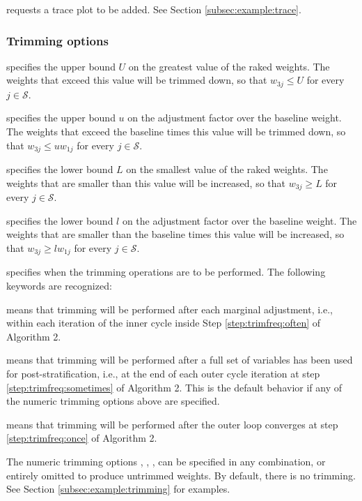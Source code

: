 \hangpara
{} requests a trace plot to be added. See
Section \ref{subsec:example:trace}.

\subsubsection{Trimming options}
\label{subsubsec:trimming}

\hangpara
{} specifies the upper bound $U$ on the greatest
    value of the raked weights.  The weights that
    exceed this value will be trimmed down, so that
    $w_{3j} \le U$ for every $j\in\mathcal{S}$.

\hangpara
{} specifies the upper bound $u$ on the adjustment
    factor over the baseline weight. The weights
    that exceed the baseline times this value will be trimmed down,
    so that $w_{3j} \le u w_{1j}$ for every $j\in\mathcal{S}$.

\hangpara
{} specifies the lower bound $L$ on the smallest value
    of the raked weights.  The weights that are smaller than this value will
    be increased, so that $w_{3j} \ge L$ for every $j\in\mathcal{S}$.

\hangpara
{} specifies the lower bound $l$ on the adjustment factor
    over the baseline weight.  The weights that are smaller than the baseline
    times this value will be increased, so that
    $w_{3j} \ge l w_{1j}$ for every $j\in\mathcal{S}$.

\hangpara
{} specifies when the trimming operations
    are to be performed. The following keywords are recognized:

\morehang {} means that trimming will be performed
    after each marginal adjustment, i.e., within each iteration of the inner
    cycle inside Step \ref{step:trimfreq:often} of Algorithm 2.

\morehang {} means that trimming will be performed
    after a full set of variables has been used for post-stratification, i.e.,
    at the end of each outer cycle iteration at step \ref{step:trimfreq:sometimes} of
    Algorithm 2. This is the default behavior if any of the numeric trimming
    options above are specified.

\morehang {}
    means that trimming will be performed after the outer loop converges
    at step \ref{step:trimfreq:once} of Algorithm 2.

The numeric trimming options , ,
,  can be specified in any combination,
or entirely omitted to produce untrimmed weights. By default, there is no trimming.
See Section \ref{subsec:example:trimming} for examples.

